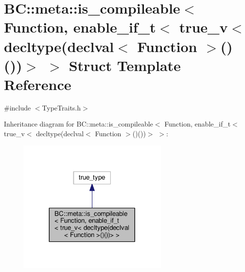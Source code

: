\hypertarget{structBC_1_1meta_1_1is__compileable_3_01Function_00_01enable__if__t_3_01true__v_3_01decltype_07d8adad13b4eb1e0e26c7d725c9c1dd19e}{}\section{BC\+:\+:meta\+:\+:is\+\_\+compileable$<$ Function, enable\+\_\+if\+\_\+t$<$ true\+\_\+v$<$ decltype(declval$<$ Function $>$()())$>$ $>$ Struct Template Reference}
\label{structBC_1_1meta_1_1is__compileable_3_01Function_00_01enable__if__t_3_01true__v_3_01decltype_07d8adad13b4eb1e0e26c7d725c9c1dd19e}


{\ttfamily \#include $<$Type\+Traits.\+h$>$}



Inheritance diagram for BC\+:\+:meta\+:\+:is\+\_\+compileable$<$ Function, enable\+\_\+if\+\_\+t$<$ true\+\_\+v$<$ decltype(declval$<$ Function $>$()())$>$ $>$\+:
\nopagebreak
\begin{figure}[H]
\begin{center}
\leavevmode
\includegraphics[width=212pt]{structBC_1_1meta_1_1is__compileable_3_01Function_00_01enable__if__t_3_01true__v_3_01decltype_07d0c04e0640a8d38ed4309ccab81727b41}
\end{center}
\end{figure}


